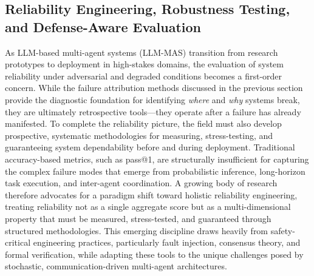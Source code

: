 \documentclass[11pt]{article}
\begin{document}
\subsection{Reliability Engineering, Robustness Testing, and Defense-Aware Evaluation}

As LLM-based multi-agent systems (LLM-MAS) transition from research prototypes to deployment in high-stakes domains, the evaluation of system reliability under adversarial and degraded conditions becomes a first-order concern. While the failure attribution methods discussed in the previous section provide the diagnostic foundation for identifying \emph{where} and \emph{why} systems break, they are ultimately retrospective tools---they operate after a failure has already manifested. To complete the reliability picture, the field must also develop prospective, systematic methodologies for measuring, stress-testing, and guaranteeing system dependability before and during deployment. Traditional accuracy-based metrics, such as pass@1, are structurally insufficient for capturing the complex failure modes that emerge from probabilistic inference, long-horizon task execution, and inter-agent coordination. A growing body of research therefore advocates for a paradigm shift toward holistic reliability engineering, treating reliability not as a single aggregate score but as a multi-dimensional property that must be measured, stress-tested, and guaranteed through structured methodologies. This emerging discipline draws heavily from safety-critical engineering practices, particularly fault injection, consensus theory, and formal verification, while adapting these tools to the unique challenges posed by stochastic, communication-driven multi-agent architectures.
\end{document}
